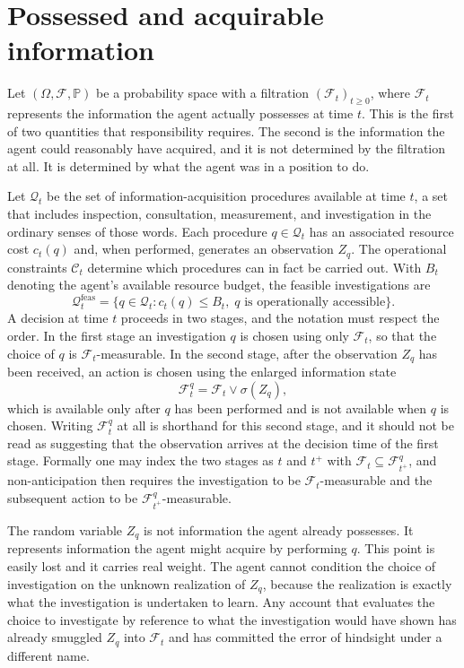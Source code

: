 \documentclass[11pt]{article}
\newcommand{\F}{\mathcal F}
\newcommand{\Q}{\mathcal Q}
\newcommand{\C}{\mathcal C}
\newcommand{\PP}{\mathbb P}
\newcommand{\feas}{\mathrm{feas}}
\theoremstyle{definition}
\begin{document}
\section{Possessed and acquirable information}

Let $(\Omega,\F,\PP)$ be a probability space with a filtration $(\F_t)_{t\ge 0}$, where $\F_t$ represents the information the agent actually possesses at time $t$. This is the first of two quantities that responsibility requires. The second is the information the agent could reasonably have acquired, and it is not determined by the filtration at all. It is determined by what the agent was in a position to do.

Let $\Q_t$ be the set of information-acquisition procedures available at time $t$, a set that includes inspection, consultation, measurement, and investigation in the ordinary senses of those words. Each procedure $q\in\Q_t$ has an associated resource cost $c_t(q)$ and, when performed, generates an observation $Z_q$. The operational constraints $\C_t$ determine which procedures can in fact be carried out. With $B_t$ denoting the agent's available resource budget, the feasible investigations are
\[
\Q_t^{\feas}
=
\bigl\{
q\in\Q_t :
c_t(q)\le B_t,\;
q\text{ is operationally accessible}
\bigr\}.
\]
A decision at time $t$ proceeds in two stages, and the notation must respect the order. In the first stage an investigation $q$ is chosen using only $\F_t$, so that the choice of $q$ is $\F_t$-measurable. In the second stage, after the observation $Z_q$ has been received, an action is chosen using the enlarged information state
\[
\F_t^{q}=\F_t\vee\sigma(Z_q),
\]
which is available only after $q$ has been performed and is not available when $q$ is chosen. Writing $\F_t^q$ at all is shorthand for this second stage, and it should not be read as suggesting that the observation arrives at the decision time of the first stage. Formally one may index the two stages as $t$ and $t^{+}$ with $\F_t\subseteq\F_{t^{+}}^{q}$, and non-anticipation then requires the investigation to be $\F_t$-measurable and the subsequent action to be $\F_{t^{+}}^{q}$-measurable.

The random variable $Z_q$ is not information the agent already possesses. It represents information the agent might acquire by performing $q$. This point is easily lost and it carries real weight. The agent cannot condition the choice of investigation on the unknown realization of $Z_q$, because the realization is exactly what the investigation is undertaken to learn. Any account that evaluates the choice to investigate by reference to what the investigation would have shown has already smuggled $Z_q$ into $\F_t$ and has committed the error of hindsight under a different name.
\end{document}
